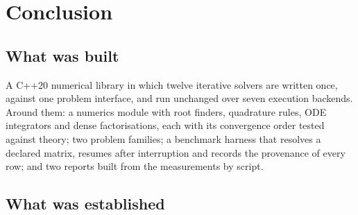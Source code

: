 \chapter{Conclusion}
\label{ch:conclusion}

\section{What was built}

A C++20 numerical library in which twelve iterative solvers are written once,
against one problem interface, and run unchanged over seven execution backends.
Around them: a numerics module with root finders, quadrature rules, ODE
integrators and dense factorisations, each with its convergence order tested
against theory; two problem families; a benchmark harness that resolves a
declared matrix, resumes after interruption and records the provenance of every
row; and two reports built from the measurements by script.

\section{What was established}

